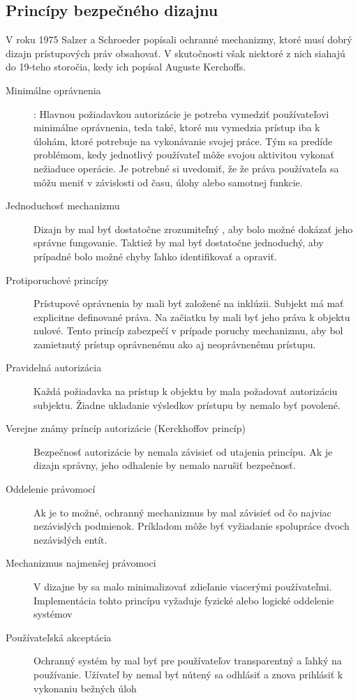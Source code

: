 \subsection{Princípy bezpečného dizajnu}
\label{sec:bezpecny dizajn}
V roku 1975 Salzer a Schroeder \cite{saltzer} popísali ochranné mechanizmy, ktoré musí dobrý dizajn prístupových práv obsahovať. V skutočnosti však niektoré z nich siahajú do 19-teho storočia, kedy ich popísal Auguste Kerchoffs. 

\begin{description}
	\item[Minimálne oprávnenia] : Hlavnou požiadavkou autorizácie je potreba vymedziť používateľovi minimálne oprávnenia, teda také, ktoré mu vymedzia prístup iba k úlohám, ktoré potrebuje na vykonávanie svojej práce. Tým sa predíde problémom, kedy jednotlivý používateľ môže svojou aktivitou vykonať nežiaduce operácie. Je potrebné si uvedomiť, že že práva používateľa sa môžu meniť v závislosti od  času, úlohy alebo samotnej funkcie. 
	\item[Jednoduchosť mechanizmu] Dizajn by mal byť dostatočne zrozumiteľný , aby bolo možné dokázať jeho správne fungovanie. Taktiež by mal byť dostatočne jednoduchý, aby prípadné bolo možné chyby ľahko identifikovať a opraviť.
	\item[Protiporuchové princípy] Prístupové oprávnenia by mali byť založené na inklúzii. Subjekt má mať explicitne definované práva. Na začiatku by mali byť jeho práva k objektu nulové. Tento princíp zabezpečí v prípade poruchy mechanizmu, aby bol zamietnutý prístup oprávnenému ako aj neoprávnenému prístupu. 
	\item[Pravidelná autorizácia] Každá požiadavka na prístup k objektu by mala požadovať autorizáciu subjektu. Žiadne ukladanie výsledkov prístupu by nemalo byť povolené.
	\item[Verejne známy príncíp autorizácie (Kerckhoffov princíp)] Bezpečnosť autorizácie by nemala závisieť od utajenia princípu. Ak je dizajn správny, jeho odhalenie by nemalo narušiť bezpečnosť.
	\item[Oddelenie právomocí] Ak je to možné, ochranný mechanizmus by mal závisieť od čo najviac nezávislých podmienok. Príkladom môže byť vyžiadanie spolupráce dvoch nezávislých entít. 
	\item[Mechanizmus najmenšej právomoci] V dizajne by sa malo minimalizovať zdieľanie viacerými používateľmi. Implementácia tohto princípu vyžaduje fyzické alebo logické oddelenie systémov
	\item[Používateľská akceptácia] Ochranný systém by mal byť pre používateľov transparentný a ľahký na používanie. Užívateľ by nemal byť nútený sa odhlásiť a znova prihlásiť k vykonaniu bežných úloh
\end{description}


